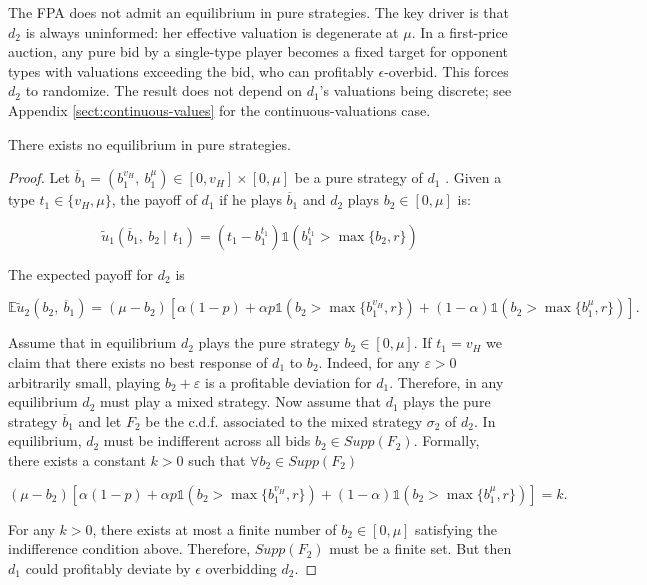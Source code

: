 \noindent The FPA does not admit an equilibrium in pure strategies. The key driver is that $ d_2 $ is always uninformed: her effective valuation is degenerate at $ \mu $. In a first-price auction, any pure bid by a single-type player becomes a fixed target for opponent types with valuations exceeding the bid, who can profitably $ \epsilon $-overbid. This forces $ d_2 $ to randomize. The result does not depend on $ d_1 $'s valuations being discrete; see Appendix \ref{sect:continuous-values} for the continuous-valuations case.

\begin{prop}\label{prop:no-pure}
There exists no equilibrium in pure strategies.
\end{prop}

\begin{proof}
\noindent Let $ \overline{b}_1 = \left(b_1^{v_H},\ b_1^{\mu}\right) \in [0, v_H] \times [0, \mu] $ be a pure strategy of $ d_1 $ . Given a type $ t_1 \in \{ v_H, \mu \} $, the payoff of $ d_1 $ if he plays $ \overline{b}_1 $ and $ d_2 $ plays $ b_2 \in [0, \mu] $ is:

\begin{equation*}
\tilde{u}_1(\overline{b}_1,\ b_2 \ | \ \ t_1) = \left( t_1 - b_1^{t_1} \right) \mathbb{1}\left( b_1^{t_1} > \max\{b_2, r\} \right)
\end{equation*}

\noindent The expected payoff for $ d_2 $ is

\begin{equation*}
 \mathbb{E}\tilde{u}_2 \left(b_2,\ \overline{b}_1 \right) = (\mu - b_2) \left[ \alpha (1 - p) + \alpha p \mathbb{1}\left(b_2 > \max\{b_1^{v_H}, r\}\right) + (1 - \alpha) \mathbb{1}\left(b_2 > \max\{b_1^{\mu}, r\}\right) \right].
\end{equation*}

\noindent Assume that in equilibrium $ d_2 $ plays the pure strategy $ b_2 \in [0, \mu] $. If $ t_1 = v_H $ we claim that there exists no best response of $ d_1 $ to $ b_2 $. Indeed, for any $ \varepsilon > 0 $ arbitrarily small, playing $ b_2 + \varepsilon $ is a profitable deviation for $ d_1 $. Therefore, in any equilibrium $ d_2 $ must play a mixed strategy. Now assume that $ d_1 $ plays the pure strategy $ \overline{b}_1 $ and let $ F_2 $ be the c.d.f. associated to the mixed strategy $ \sigma_2 $ of $ d_2 $. In equilibrium, $ d_2 $ must be indifferent across all bids $ b_2 \in Supp(F_2) $. Formally, there exists a constant $ k > 0 $ such that $ \forall b_2 \in Supp(F_2) $

\begin{equation*}
 (\mu - b_2) \left[ \alpha (1 - p) + \alpha p \mathbb{1}\left( b_2 > \max\{b_1^{v_H}, r\}\right) + (1 - \alpha) \mathbb{1}\left(b_2 > \max\{b_1^{\mu}, r\} \right) \right] = k.
\end{equation*}

\noindent For any $ k > 0 $, there exists at most a finite number of $ b_2 \in [0, \mu] $ satisfying the indifference condition above. Therefore, $ Supp(F_2) $ must be a finite set. But then $ d_1 $ could profitably deviate by $ \epsilon $ overbidding $ d_2 $.

\end{proof}


